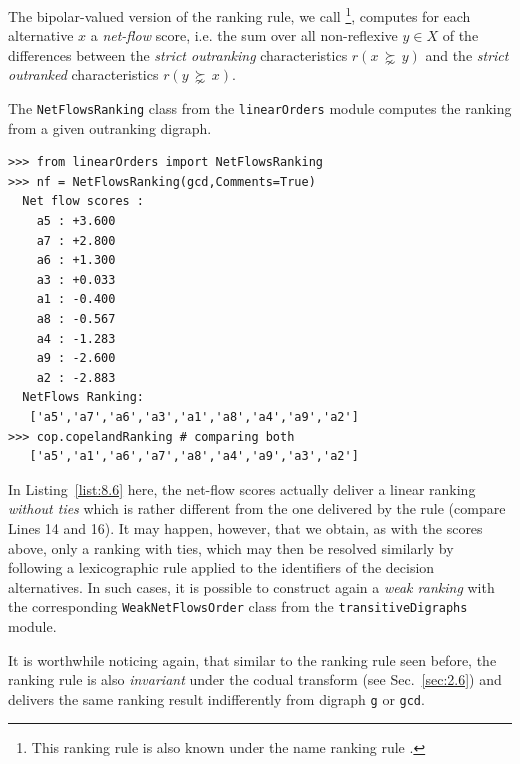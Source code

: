 \begin{definition}\label{def:8.2}

\noindent The bipolar-valued version of the \Copeland ranking rule, we call \NetFlows \footnote{This ranking rule is also known under the name \Promethee ranking rule \citep*{BRA-1985}.}, computes for each alternative $x$ a \emph{net-flow} score,  i.e. the sum over all non-reflexive $y \in X$ of the differences between the \emph{strict outranking} characteristics $r(x\, \succnsim \,y)$ and the \emph{strict outranked} characteristics $r(y\, \succnsim \,x)$.
\end{definition}

The \texttt{NetFlowsRanking} class from the \texttt{linearOrders} module computes the \NetFlows ranking from a given outranking digraph.
\begin{lstlisting}[caption={Computing a \NetFlows ranking},label=list:8.6]
>>> from linearOrders import NetFlowsRanking
>>> nf = NetFlowsRanking(gcd,Comments=True)
  Net flow scores :
    a5 : +3.600
    a7 : +2.800
    a6 : +1.300
    a3 : +0.033
    a1 : -0.400
    a8 : -0.567
    a4 : -1.283
    a9 : -2.600
    a2 : -2.883
  NetFlows Ranking:
   ['a5','a7','a6','a3','a1','a8','a4','a9','a2']
>>> cop.copelandRanking # comparing both
   ['a5','a1','a6','a7','a8','a4','a9','a3','a2']
\end{lstlisting}

In Listing~\vref{list:8.6} here, the net-flow scores actually deliver a linear ranking \emph{without ties} which is rather different from the one delivered by the \Copeland rule (compare Lines 14 and 16). It may happen, however, that we obtain, as with the \Copeland scores above, only a ranking with ties, which may then be resolved similarly by following a lexicographic rule applied to the identifiers of the decision alternatives. In such cases, it is possible to construct again a \emph{weak ranking} with the corresponding \texttt{WeakNetFlowsOrder} class from the \texttt{transitiveDigraphs} module.

It is worthwhile noticing again, that similar to the \Copeland ranking rule seen before, the \NetFlows ranking rule is also \emph{invariant} under the codual transform (see Sec.~\ref{sec:2.6}) and delivers the same ranking result indifferently from digraph \texttt{g} or \texttt{gcd}. 

